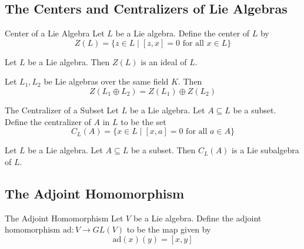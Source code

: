 \documentclass[a4paper]{article}
\begin{document}
\subsection{The Centers and Centralizers of Lie Algebras}
\begin{defn}{Center of a Lie Algebra}{} Let $L$ be a Lie algebra. Define the center of $L$ by $$Z(L)=\{z\in L\;|\;[z,x]=0\text{ for all }x\in L\}$$
\end{defn}

\begin{lmm}{}{} Let $L$ be a Lie algebra. Then $Z(L)$ is an ideal of $L$. 
\end{lmm}

\begin{prp}{}{} Let $L_1,L_2$ be Lie algebras over the same field $K$. Then $$Z(L_1\oplus L_2)=Z(L_1)\oplus Z(L_2)$$
\end{prp}

\begin{defn}{The Centralizer of a Subset}{} Let $L$ be a Lie algebra. Let $A\subseteq L$ be a subset. Define the centralizer of $A$ in $L$ to be the set $$C_L(A)=\{x\in L\;|\;[x,a]=0\text{ for all }a\in A\}$$
\end{defn}

\begin{lmm}{}{} Let $L$ be a Lie algebra. Let $A\subseteq L$ be a subset. Then $C_L(A)$ is a Lie subalgebra of $L$. 
\end{lmm}

\subsection{The Adjoint Homomorphism}
\begin{defn}{The Adjoint Homomorphism}{} Let $V$ be a Lie algebra. Define the adjoint homomorphism $\text{ad}:V\to GL(V)$ to be the map given by $$\text{ad}(x)(y)=[x,y]$$
\end{defn}
\end{document}
